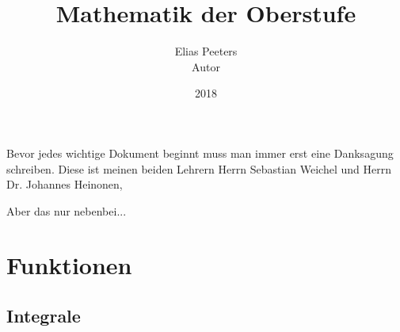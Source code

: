 \documentclass[11pt]{article}
\title{Mathematik der Oberstufe}
\author{Elias Peeters \\ Autor}
\date{2018}
\begin{document}
	\maketitle
	\newpage
	
	\begin{center}
		Bevor jedes wichtige Dokument beginnt muss man immer erst eine Danksagung schreiben. Diese ist meinen beiden Lehrern Herrn Sebastian Weichel und Herrn Dr. Johannes Heinonen, 
		\newline
		
		Aber das nur nebenbei...
	\end{center}
	
	\newpage
	
	\tableofcontents
	
	\newpage
	
	\section{Funktionen}
	
	 
	\subsection{Integrale}
	
	
\end{document}
